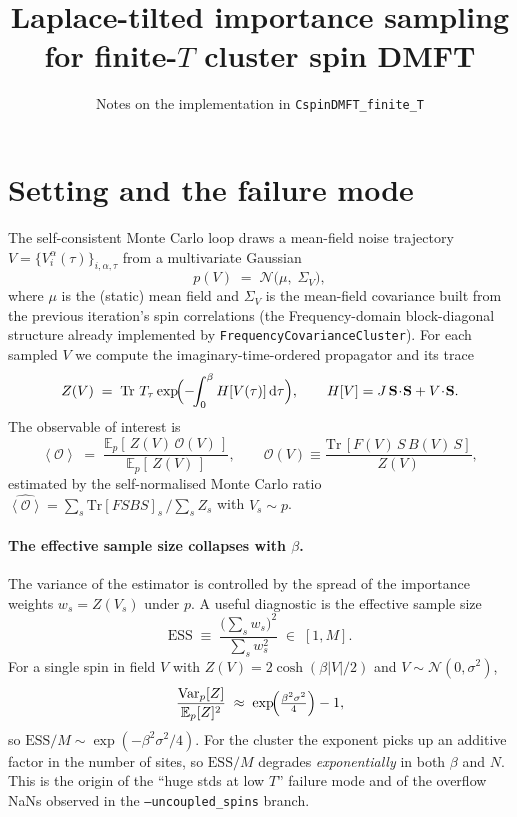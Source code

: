 \documentclass[11pt]{article}
\title{Laplace-tilted importance sampling for finite-$T$ cluster spin DMFT}
\author{Notes on the implementation in \texttt{CspinDMFT\_finite\_T}}
\date{}
\newcommand{\ev}[1]{\left\langle #1 \right\rangle}
\newcommand{\dd}{\mathrm{d}}
\newcommand{\Tr}{\mathrm{Tr}\,}
\newcommand{\Sig}{\Sigma_V}
\begin{document}
\maketitle

\section{Setting and the failure mode}

The self-consistent Monte Carlo loop draws a mean-field noise trajectory
$V = \{V_i^\alpha(\tau)\}_{i,\alpha,\tau}$ from a multivariate Gaussian
\begin{equation}
  p(V) \;=\; \mathcal{N}\!\bigl(\mu,\;\Sig\bigr),
  \label{eq:p}
\end{equation}
where $\mu$ is the (static) mean field and $\Sig$ is the mean-field
covariance built from the previous iteration's spin correlations
(the Frequency-domain block-diagonal structure already implemented by
\texttt{FrequencyCovarianceCluster}). For each sampled $V$ we compute
the imaginary-time-ordered propagator and its trace
\begin{equation}
  Z(V) \;=\; \Tr\, T_\tau \exp\!\Bigl(-\!\!\int_0^\beta H[V(\tau)]\,\dd\tau\Bigr),
  \qquad
  H[V] = J\,\mathbf{S}\!\cdot\!\mathbf{S} + V\!\cdot\!\mathbf{S}.
  \label{eq:Z}
\end{equation}
The observable of interest is
\begin{equation}
  \ev{\mathcal{O}} \;=\;
  \frac{\mathbb{E}_p\!\left[\,Z(V)\,\mathcal{O}(V)\,\right]}{\mathbb{E}_p\!\left[\,Z(V)\,\right]},
  \qquad
  \mathcal{O}(V) \equiv \frac{\Tr\!\left[F(V)\,S\,B(V)\,S\right]}{Z(V)},
  \label{eq:estimator}
\end{equation}
estimated by the self-normalised Monte Carlo ratio
$\widehat{\ev{\mathcal{O}}} = \sum_s \mathrm{Tr}[FSBS]_s\,/\sum_s Z_s$
with $V_s \sim p$.

\paragraph{The effective sample size collapses with $\beta$.}
The variance of the estimator is controlled by the spread of the
importance weights $w_s = Z(V_s)$ under $p$. A useful diagnostic is the
effective sample size
\begin{equation}
  \mathrm{ESS} \;\equiv\; \frac{\bigl(\sum_s w_s\bigr)^2}{\sum_s w_s^2} \;\in\;[1,M].
  \label{eq:ess}
\end{equation}
For a single spin in field $V$ with $Z(V)=2\cosh(\beta\!\left|V\right|/2)$
and $V\!\sim\!\mathcal{N}(0,\sigma^2)$,
\begin{equation}
  \frac{\mathrm{Var}_p[Z]}{\mathbb{E}_p[Z]^2}
  \;\approx\; \exp\!\Bigl(\tfrac{\beta^2\sigma^2}{4}\Bigr) - 1,
  \label{eq:varZ}
\end{equation}
so $\mathrm{ESS}/M \sim \exp(-\beta^2\sigma^2/4)$.
For the cluster the exponent picks up an additive factor in the number of sites,
so $\mathrm{ESS}/M$ degrades \emph{exponentially} in both $\beta$ and $N$.
This is the origin of the ``huge stds at low $T$'' failure mode and of
the overflow NaNs observed in the \texttt{--uncoupled\_spins} branch.
\end{document}
